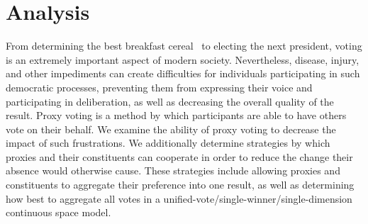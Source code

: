 %
%

\renewcommand{\chptindicator}{ch2}

\setcounter{chapter}{1}
\chapter{Analysis}\label{ch:analysis}
\thispagestyle{empty}
From determining the best breakfast cereal~\cite{Curtis2021} to electing the next
president, voting is an extremely important aspect of modern society.
Nevertheless, disease, injury, and other impediments can create difficulties for
individuals participating in such democratic processes, preventing them from
expressing their voice and participating in deliberation, as well as decreasing
the overall quality of the result.
Proxy voting is a method by which participants are able to have others vote on their
behalf.
We examine the ability of proxy voting to decrease the impact of such frustrations.
We additionally determine strategies by which proxies and their constituents can
cooperate in order to reduce the change their absence would otherwise cause.
These strategies include allowing proxies and constituents to aggregate their
preference into one result, as well as determining how best to aggregate all votes
in a unified-vote/single-winner/single-dimension continuous space model.









